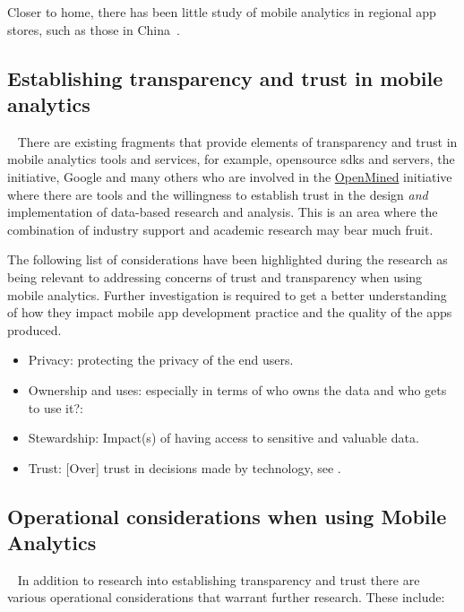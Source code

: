 Closer to home, there has been little study of mobile analytics in regional app stores, such as those in China~.


\subsection{Establishing transparency and trust in mobile analytics}~\label{fw-establishing-transparency-and-trust-in-mobile-analytics}
There are existing fragments that provide elements of transparency and trust in mobile analytics tools and services, for example, opensource \Glspl{sdk} and servers, the  initiative, Google and many others who are involved in the \href{https://www.openmined.org/}{OpenMined} initiative~ %
where there are tools and the willingness to establish trust in the design \emph{and} implementation of data-based research and analysis. This is an area where the combination of industry support and academic research may bear much fruit. 

The following list of considerations have been highlighted during the research as being relevant to addressing concerns of trust and transparency when using mobile analytics. Further investigation is required to get a better understanding of how they impact mobile app development practice and the quality of the apps produced.

\begin{itemize}
    \item Privacy: protecting the privacy of the end users. 
    \item Ownership and uses: especially in terms of who owns the data and who gets to use it?:
    \item Stewardship: Impact(s) of having access to sensitive and valuable data.  
    \item Trust: [Over] trust in decisions made by technology, see .
\end{itemize}


\subsection{Operational considerations when using Mobile Analytics}~\label{fw-operational-considerations-topic}
In addition to research into establishing transparency and trust there are various operational considerations that warrant further research. These include: 

